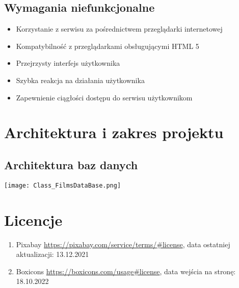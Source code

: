 \documentclass[12pt]{article}
\begin{document}
		\subsection{Wymagania niefunkcjonalne}
			\begin{itemize}
				\item Korzystanie z serwisu za pośrednictwem przeglądarki internetowej
				\item Kompatybilność z przeglądarkami obsługującymi HTML 5
				\item Przejrzysty interfejs użytkownika
				\item Szybka reakcja na działania użytkownika
				\item Zapewnienie ciągłości dostępu do serwisu użytkownikom
			\end{itemize}
	\section{Architektura i zakres projektu}
		\subsection{Architektura baz danych}
			\begin{center}
				\texttt{[image: Class\_FilmsDataBase.png]}
			\end{center}
	\pagebreak
	\section{Licencje}
		\begin{enumerate}
			\item	Pixabay
			\url{https://pixabay.com/service/terms/#license}, 
			data ostatniej aktualizacji: 13.12.2021
			
			
			\item	Boxicons
			\url{https://boxicons.com/usage#license}, 
			data wejścia na stronę: 18.10.2022
		\end{enumerate}
	
	
\end{document}
